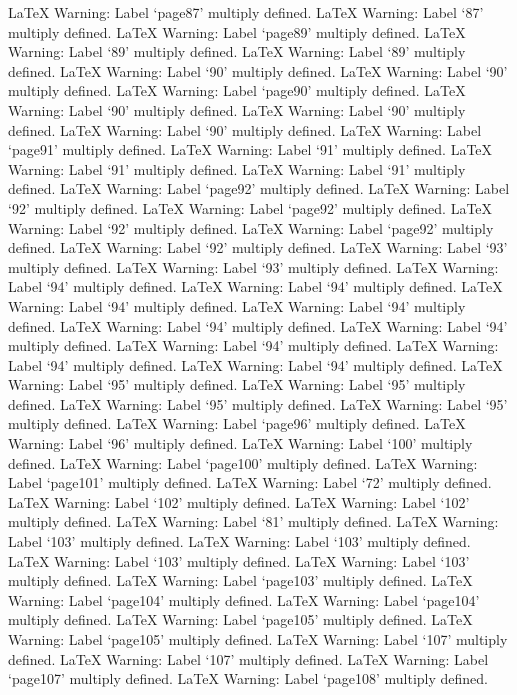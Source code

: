 LaTeX Warning: Label `page87' multiply defined.
LaTeX Warning: Label `87' multiply defined.
LaTeX Warning: Label `page89' multiply defined.
LaTeX Warning: Label `89' multiply defined.
LaTeX Warning: Label `89' multiply defined.
LaTeX Warning: Label `90' multiply defined.
LaTeX Warning: Label `90' multiply defined.
LaTeX Warning: Label `page90' multiply defined.
LaTeX Warning: Label `90' multiply defined.
LaTeX Warning: Label `90' multiply defined.
LaTeX Warning: Label `90' multiply defined.
LaTeX Warning: Label `page91' multiply defined.
LaTeX Warning: Label `91' multiply defined.
LaTeX Warning: Label `91' multiply defined.
LaTeX Warning: Label `91' multiply defined.
LaTeX Warning: Label `page92' multiply defined.
LaTeX Warning: Label `92' multiply defined.
LaTeX Warning: Label `page92' multiply defined.
LaTeX Warning: Label `92' multiply defined.
LaTeX Warning: Label `page92' multiply defined.
LaTeX Warning: Label `92' multiply defined.
LaTeX Warning: Label `93' multiply defined.
LaTeX Warning: Label `93' multiply defined.
LaTeX Warning: Label `94' multiply defined.
LaTeX Warning: Label `94' multiply defined.
LaTeX Warning: Label `94' multiply defined.
LaTeX Warning: Label `94' multiply defined.
LaTeX Warning: Label `94' multiply defined.
LaTeX Warning: Label `94' multiply defined.
LaTeX Warning: Label `94' multiply defined.
LaTeX Warning: Label `94' multiply defined.
LaTeX Warning: Label `94' multiply defined.
LaTeX Warning: Label `95' multiply defined.
LaTeX Warning: Label `95' multiply defined.
LaTeX Warning: Label `95' multiply defined.
LaTeX Warning: Label `95' multiply defined.
LaTeX Warning: Label `page96' multiply defined.
LaTeX Warning: Label `96' multiply defined.
LaTeX Warning: Label `100' multiply defined.
LaTeX Warning: Label `page100' multiply defined.
LaTeX Warning: Label `page101' multiply defined.
LaTeX Warning: Label `72' multiply defined.
LaTeX Warning: Label `102' multiply defined.
LaTeX Warning: Label `102' multiply defined.
LaTeX Warning: Label `81' multiply defined.
LaTeX Warning: Label `103' multiply defined.
LaTeX Warning: Label `103' multiply defined.
LaTeX Warning: Label `103' multiply defined.
LaTeX Warning: Label `103' multiply defined.
LaTeX Warning: Label `page103' multiply defined.
LaTeX Warning: Label `page104' multiply defined.
LaTeX Warning: Label `page104' multiply defined.
LaTeX Warning: Label `page105' multiply defined.
LaTeX Warning: Label `page105' multiply defined.
LaTeX Warning: Label `107' multiply defined.
LaTeX Warning: Label `107' multiply defined.
LaTeX Warning: Label `page107' multiply defined.
LaTeX Warning: Label `page108' multiply defined.
